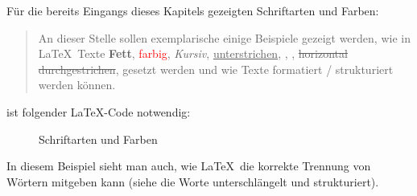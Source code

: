 Für die bereits Eingangs dieses Kapitels gezeigten Schriftarten und Farben:

\begin{quote}

An dieser Stelle sollen exemplarische einige Beispiele gezeigt werden, wie in \LaTeX\ Texte \textbf{Fett}, \textcolor{red}{farbig}, \textit{Kursiv}, \underline{unterstrichen}, , , \sout{horizontal durchgestrichen},  gesetzt werden und wie Texte formatiert / struk\-tu\-riert werden können.

\end{quote}

ist folgender \LaTeX-Code notwendig: 

\begin{figure}[h!]
    \centering
      \caption{Schriftarten und Farben}
\end{figure} 

In diesem Beispiel sieht man auch, wie \LaTeX\ die korrekte Trennung von Wörtern mitgeben kann (siehe die Worte unterschlängelt und strukturiert).
